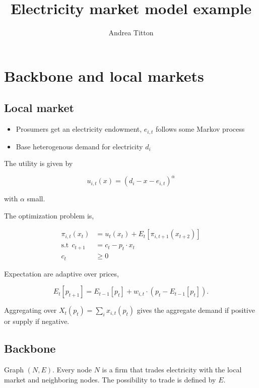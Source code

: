 \documentclass[american]{scrartcl}
\title{
        Electricity market model example
    }
\author{Andrea Titton}
\begin{document}
\maketitle

\section*{Backbone and local markets}

\subsection*{Local market}

\begin{itemize}
    \item Prosumers get an electricity endowment, $e_{i, t}$ follows some Markov process
    \item Base heterogenous demand for electricity $d_i$
\end{itemize}

The utility is given by

\begin{equation}
    u_{i, t}(x) = (d_i - x - e_{i, t})^\alpha
\end{equation}

with $\alpha$ small.

The optimization problem is,

\begin{equation}
    \begin{split}
        \pi_{i, t}(x_t) &= u_t(x_t) + E_t\left[ \pi_{i, t+1}(x_{t+2}) \right] \\
        \text{s.t} \ \ c_{t+1} &= c_t - p_t \cdot x_t \\
        c_t &\geq 0
    \end{split}
\end{equation}

Expectation are adaptive over prices,

\begin{equation}
    E_t[p_{t+1}] = E_{t-1}[p_t] + w_{i, t} \cdot \left(p_t - E_{t-1}[p_t] \right).
\end{equation}

Aggregating over $X_t(p_t) = \sum_{i} x_{i, t}(p_t)$ gives the aggregate demand if positive or supply if negative.

\subsection*{Backbone}

Graph $(N, E)$. Every node $N$ is a firm that trades electricity with the local market and neighboring nodes. The possibility to trade is defined by $E$.
\end{document}
